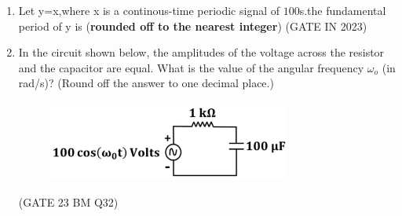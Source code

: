 \begin{enumerate}[label=\thechapter.\arabic*,ref=\thechapter.\theenumi]
\item Let y=x,where x is a continous-time periodic signal of $100$s.the fundamental period of y is (\textbf{rounded off to the nearest integer})
 \hfill(GATE IN 2023)\\
\solution

\item
In the circuit shown below, the amplitudes of the voltage across the resistor and the capacitor are equal. What is the value of the angular frequency $\omega_o$ (in rad/s)? 
(Round off the answer to one decimal place.)
\begin{figure}[ht]
    \centering
    \includegraphics[width = 8cm]{2023/BM/32/figs/fig1.jpg}
    \label{fig:BM_32}
\end{figure}\hfill(GATE 23 BM Q32)\\
\solution

\end{enumerate}
